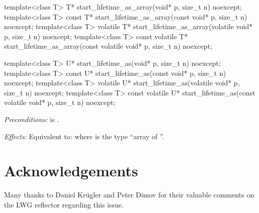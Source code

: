 \begin{removedblock}
\begin{codeblock}
template<class T>
  T* start_lifetime_as_array(void* p, size_t n) noexcept;
template<class T>
  const T* start_lifetime_as_array(const void* p, size_t n) noexcept;
template<class T>
  volatile T* start_lifetime_as_array(volatile void* p, size_t n) noexcept;
template<class T>
  const volatile T* start_lifetime_as_array(const volatile void* p, size_t n) noexcept;
\end{codeblock}
\end{removedblock}
\begin{addedblock}
\begin{codeblock}
template<class T>
  U* start_lifetime_as(void* p, size_t n) noexcept;
template<class T>
  const U* start_lifetime_as(const void* p, size_t n) noexcept;
template<class T>
  volatile U* start_lifetime_as(volatile void* p, size_t n) noexcept;
template<class T>
  const volatile U* start_lifetime_as(const volatile void* p, size_t n) noexcept;
\end{codeblock}
\end{addedblock}

\begin{adjustwidth}{0.5cm}{0.5cm}

\emph{Preconditions:}  is .

\emph{Effects:} Equivalent to:  where  is the type ``array of  ''.
\end{adjustwidth}


\pagebreak %

\section*{Acknowledgements}
Many thanks to Daniel Kr\" ugler and Peter Dimov for their valuable comments on the LWG reflector regarding this issue.


\renewcommand{\bibname}{References}



